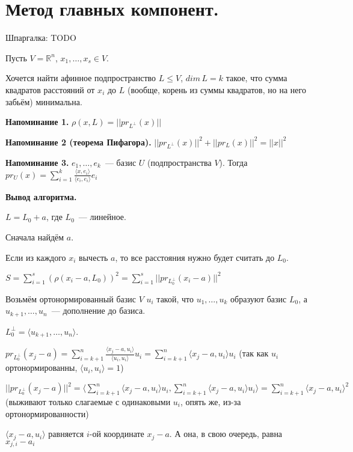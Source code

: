 \section{
Метод главных компонент.
}

Шпаргалка: TODO

Пусть $V = \mathbb{R}^n$, $x_1,\ldots, x_s \in V$.

Хочется найти афинное подпространство $L\le V$, $dim\,L = k$ такое, что сумма квадратов расстояний от $x_i$ до $L$ (вообще, корень из суммы квадратов, но на него забьём) минимальна.

{\bf Напоминание 1.} $\rho(x, L) = ||pr_{L^{\perp}}(x)||$

{\bf Напоминание 2 (теорема Пифагора).} $||pr_{L^{\perp}}(x)||^2 + ||pr_L(x)||^2 = ||x||^2$

{\bf Напоминание 3.} $e_1,\ldots,e_k$~--- базис $U$ (подпространства $V$). Тогда $pr_U(x)=\sum\limits_{i=1}^k\frac{\langle x, e_i\rangle}{\langle e_i, e_i\rangle}e_i$

{\bf Вывод алгоритма.}

$L = L_0 + a$, где $L_0$~--- линейное. 

Сначала найдём $a$.


\proofname

Если из каждого $x_i$ вычесть $a$, то все расстояния нужно будет считать до $L_0$.

$S = \sum\limits_{i = 1}^s (\rho(x_i-a, L_0))^2 = \sum\limits_{i = 1}^s ||pr_{L_0^{\perp}}(x_i-a)||^2$

Возьмём ортонормированный базис $V$ $u_i$ такой, что $u_1,\ldots, u_k$ образуют базис $L_0$, а $u_{k+1},\ldots,u_n$~--- дополнение до базиса.

$L_0^\perp = \langle u_{k+1},\ldots,u_n\rangle$. 

$pr_{L_0^{\perp}}(x_j-a) = \sum\limits_{i = k + 1}^n \frac{\langle x_j - a, u_i\rangle}{\langle u_i, u_i\rangle}u_i = \sum\limits_{i = k + 1}^n \langle x_j - a, u_i\rangle u_i$ (так как $u_i$ ортонормированны, $\langle u_i, u_i\rangle = 1$)

$||pr_{L_0^{\perp}}(x_j-a)||^2 = \langle\sum\limits_{i = k + 1}^n \langle x_j - a, u_i\rangle u_i, \sum\limits_{i = k + 1}^n \langle x_j - a, u_i\rangle u_i\rangle = \sum\limits_{i = k + 1}^n \langle x_j - a, u_i\rangle^2$ (выживают только слагаемые с одинаковыми $u_i$, опять же, из-за ортонормированности)

$\langle x_j - a, u_i\rangle$ равняется $i$-ой координате $x_j - a$. А она, в свою очередь, равна $x_{j, i} - a_i$

